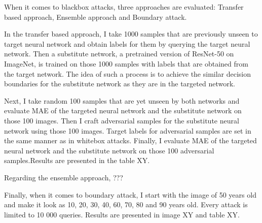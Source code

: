 When it comes to blackbox attacks, three approaches are evaluated: Transfer based approach, Ensemble approach and Boundary attack.

In the transfer based approach, I take 1000 samples that are previously unseen to target neural network and obtain labels for them by querying the target neural network. Then a substitute network, a pretrained version of ResNet-50 on ImageNet, is trained on those 1000 samples with labels that are obtained from the target network. The idea of such a process is to achieve the similar decision boundaries for the substitute network as they are in the targeted network.

Next, I take random 100 samples that are yet unseen by both networks and evaluate  MAE of the targeted neural network and the substitute network on those 100 images. Then I craft adversarial samples for the substitute neural network using those 100 images. Target labels for adversarial samples are set in the same manner as in whitebox attacks. Finally, I evaluate MAE of the targeted neural network and the substitute network on those 100 adversarial samples.Results are presented in the table XY. 


Regarding the ensemble approach, ???

Finally, when it comes to boundary attack, I start with the image of 50 years old and make it look as 10, 20, 30, 40, 60, 70, 80 and 90 years old. Every attack is limited to 10 000 queries. Results are presented in image XY and table XY.


